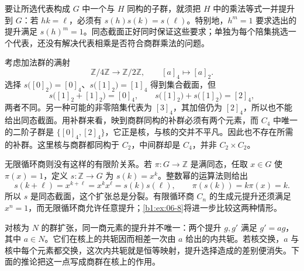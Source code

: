 \ProseParagraphBreak
要让所选代表构成 \(G\) 中一个与 \(H\) 同构的子群，就须把 \(H\) 中的乘法等式一并提升到 \(G\)：若 \(hk=\ell\)，必须有 \(s(h)s(k)=s(\ell)\)。特别地，\(h^m=1\) 要求选出的提升满足 \(s(h)^m=1\)。同态截面正好同时保证这些要求；单独为每个陪集挑选一个代表，还没有解决代表相乘是否符合商群乘法的问题。

\ProseParagraphBreak
考虑加法群的满射
\[
	\mathbb Z/4\mathbb Z\longrightarrow\mathbb Z/2\mathbb Z, \qquad [a]_4\longmapsto[a]_2.
\]
选择 \(s\bigl([0]_2\bigr)=[0]_4\)、\(s\bigl([1]_2\bigr)=[1]_4\) 得到集合截面，但
\[
	s\bigl([1]_2+[1]_2\bigr)=[0]_4,\qquad s\bigl([1]_2\bigr)+s\bigl([1]_2\bigr)=[2]_4,
\]
两者不同。另一种可能的非零陪集代表为 \([3]_4\)，其加倍仍为 \([2]_4\)，所以也不能给出同态截面。用补群来看，映到商群同构的补群必须有两个元素，而 \(C_4\) 中唯一的二阶子群是 \(\{[0]_4,[2]_4\}\)，它正是核，与核的交并不平凡。因此也不存在所需的补群。这里核与商群都同构于 \(C_2\)，中间群却是 \(C_4\)，并非 \(C_2\times C_2\)。

\ProseParagraphBreak
无限循环商则没有这样的有限阶关系。若 \(\pi:G\rightarrow\mathbb Z\) 是满同态，任取 \(x\in G\) 使 \(\pi(x)=1\)，定义 \(s:\mathbb Z\rightarrow G\) 为 \(s(k)=x^k\)。整数幂的运算法则给出
\[
	s(k+\ell)=x^{k+\ell}=x^kx^\ell=s(k)s(\ell), \qquad \pi(s(k))=k\pi(x)=k.
\]
所以 \(s\) 是同态截面，这个扩张总是分裂。有限循环商 \(C_n\) 的生成元提升还须满足 \(x^n=1\)，而无限循环商允许任意提升；\cref{b1:ex:06-8}将进一步比较这两种情形。

\ProseParagraphBreak
对核为 \(N\) 的群扩张，同一商元素的提升并不唯一：两个提升 \(g,g'\) 满足 \(g'=ag\)，其中 \(a\in N\)。它们在核上的共轭因而相差一次由 \(a\) 给出的内共轭。若核交换，\(a\) 与核中每个元素都交换，这次内共轭就是恒等映射，提升选择造成的差别便消失。下面的推论把这一点写成商群在核上的作用。

